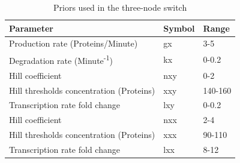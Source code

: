 \begin{table}[htpb]
\centering
\caption{Priors used in the three-node switch}
\label{tab:multi_priors}
\begin{tabular}{@{}lll@{}}
\toprule
Parameter                           & Symbol & Range   \\ \midrule
Production rate (Proteins/Minute)               & gx        & 3-5    \\
Degradation rate  (Minute\textsuperscript{-1})             & kx        & 0-0.2     \\
Hill coefficient               & nxy       & 0-2    \\
Hill thresholds concentration (Proteins) & xxy       & 140-160 \\
Transcription rate fold change & lxy       & 0-0.2     \\
Hill coefficient               & nxx       & 2-4     \\
Hill thresholds concentration (Proteins) & xxx       & 90-110  \\
Transcription rate fold change & lxx       & 8-12    \\ \bottomrule
\end{tabular}
\end{table}

